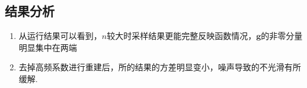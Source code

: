 \documentclass[UTF8]{ctexart}
\begin{document}
\subsection{结果分析}
\begin{enumerate}
  \item 从运行结果可以看到，$n$较大时采样结果更能完整反映函数情况，$\mathbf{g}$的非零分量明显集中在两端
  \item 去掉高频系数进行重建后，所的结果的方差明显变小，噪声导致的不光滑有所缓解.
\end{enumerate}



\end{document}
